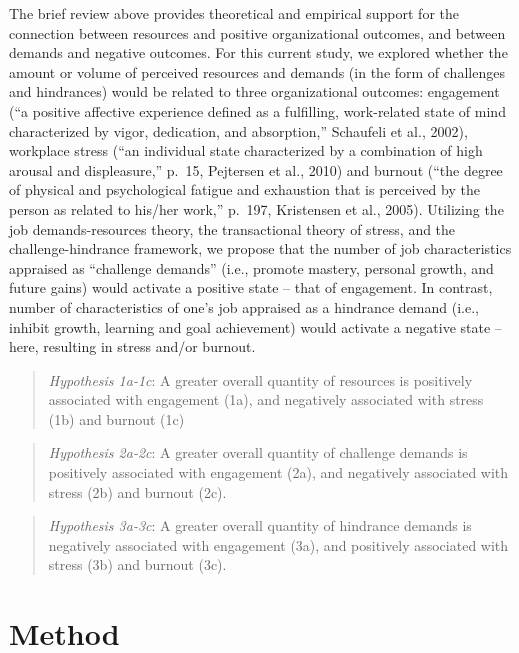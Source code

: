 \documentclass[
  man]{apa6}
\begin{document}
The brief review above provides theoretical and empirical support for the connection between resources and positive organizational outcomes, and between demands and negative outcomes. For this current study, we explored whether the amount or volume of perceived resources and demands (in the form of challenges and hindrances) would be related to three organizational outcomes: engagement (``a positive affective experience defined as a fulfilling, work-related state of mind characterized by vigor, dedication, and absorption,'' Schaufeli et al., 2002), workplace stress (``an individual state characterized by a combination of high arousal and displeasure,'' p.~15, Pejtersen et al., 2010) and burnout (``the degree of physical and psychological fatigue and exhaustion that is perceived by the person as related to his/her work,'' p.~197, Kristensen et al., 2005). Utilizing the job demands-resources theory, the transactional theory of stress, and the challenge-hindrance framework, we propose that the number of job characteristics appraised as ``challenge demands'' (i.e., promote mastery, personal growth, and future gains) would activate a positive state -- that of engagement. In contrast, number of characteristics of one's job appraised as a hindrance demand (i.e., inhibit growth, learning and goal achievement) would activate a negative state -- here, resulting in stress and/or burnout.

\begin{quote}
\emph{Hypothesis 1a-1c}: A greater overall quantity of resources is positively associated with engagement (1a), and negatively associated with stress (1b) and burnout (1c)
\end{quote}

\begin{quote}
\emph{Hypothesis 2a-2c}: A greater overall quantity of challenge demands is positively associated with engagement (2a), and negatively associated with stress (2b) and burnout (2c).
\end{quote}

\begin{quote}
\emph{Hypothesis 3a-3c}: A greater overall quantity of hindrance demands is negatively associated with engagement (3a), and positively associated with stress (3b) and burnout (3c).
\end{quote}

\hypertarget{method}{%
\section{Method}\label{method}}
\end{document}
